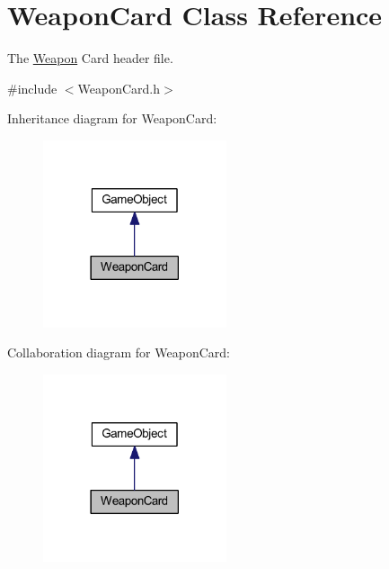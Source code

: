 \hypertarget{class_weapon_card}{\section{Weapon\+Card Class Reference}
\label{class_weapon_card}
}


The \hyperlink{class_weapon}{Weapon} Card header file.  




{\ttfamily \#include $<$Weapon\+Card.\+h$>$}



Inheritance diagram for Weapon\+Card\+:\nopagebreak
\begin{figure}[H]
\begin{center}
\leavevmode
\includegraphics[width=153pt]{class_weapon_card__inherit__graph}
\end{center}
\end{figure}


Collaboration diagram for Weapon\+Card\+:\nopagebreak
\begin{figure}[H]
\begin{center}
\leavevmode
\includegraphics[width=153pt]{class_weapon_card__coll__graph}
\end{center}
\end{figure}
